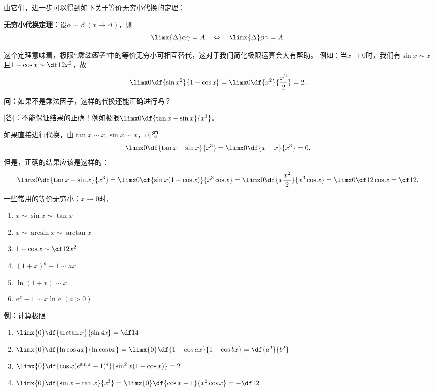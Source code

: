 由它们，进一步可以得到如下关于等价无穷小代换的定理：

\begin{thx}
	{\bf 无穷小代换定理：}设$\alpha\sim \beta\;(x\to\Delta)$，则
	$$\limx{\Delta}\alpha\gamma=A
	\quad\Leftrightarrow\quad\limx{\Delta}\beta\gamma=A.$$
\end{thx}

这个定理意味着，极限“{\it 乘法因子}”中的等价无穷小可相互替代，这对于我们简化极限运算会大有帮助。
例如：当$x\to 0$时，我们有$\sin x\sim x$且$1-\cos x\sim\df12x^2$，故
$$\limx0\df{\sin x^2}{1-\cos x}=\limx0\df{x^2}{\frac{x^2}2}=2.$$

{\bf 问：}如果不是乘法因子，这样的代换还能正确进行吗？

[答]：不能保证结果的正确！例如极限$\limx0\df{\tan x-\sin x}{x^3}$。

如果直接进行代换，由$\tan x\sim x,\sin x\sim x$，可得
$$\limx0\df{\tan x-\sin x}{x^3}=\limx0\df{x-x}{x^3}=0.$$
但是，正确的结果应该是这样的：
$$
	\limx0\df{\tan x-\sin x}{x^3}
	=\limx0\df{\sin x(1-\cos x)}{x^3\cos x}
	=\limx0\df{x\frac{x^2}2}{x^3\cos x}
	=\limx0\df1{2\cos x}=\df12.
$$

\begin{thx}
	一些常用的等价无穷小：$x\to 0$时，
	\begin{enumerate}[(1)]
	  \item $x\sim \sin x\sim \tan x$ 
	  \item $x \sim\arcsin x\sim\arctan x$ 
	  \item $1-\cos x\sim \df 12 x^2$ 
	  \item $(1+x)^a-1\sim ax$ 
	  \item $\ln(1+x)\sim x$ 
	  \item $a^x-1\sim x\ln a\;(a>0)$
	\end{enumerate}
\end{thx}

{\bf 例：}计算极限
\begin{enumerate}[(1)]
  \setlength{\itemindent}{1cm}
  \item $\limx{0}\df{\arctan x}{\sin 4x}=\df14$ 
  \item $\limx{0}\df{\ln\cos ax}{\ln\cos bx}=\limx{0}\df{1-\cos ax}{1-\cos
  bx}=\df{a^2}{b^2}$
  \item $\limx{0}\df{\cos x(e^{\sin x}-1)^4}{\sin^2 x(1-\cos x)}=2$ 
  \item $\limx{0}\df{\sin x-\tan x}{x^3}=\limx{0}\df{\cos x-1}{x^2\cos
  x}=-\df12$
\end{enumerate}


